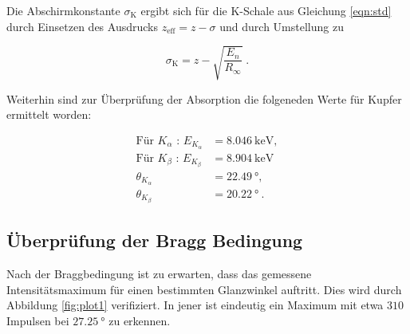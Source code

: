   Die Abschirmkonstante $\sigma_\text{K}$ ergibt sich für die K-Schale aus Gleichung
  \eqref{eqn:std} durch Einsetzen des Ausdrucks $z_\text{eff} = z -\sigma$ und durch 
  Umstellung zu 

  \begin{equation}
    \sigma_\text{K} = z - \sqrt{\frac{E_n}{R_{\infty}}} \; .
    \label{eqn:sigma}
  \end{equation}

  Weiterhin sind zur Überprüfung der Absorption die folgeneden Werte für Kupfer 
  ermittelt worden:

  \begin{align*}
    \text{Für } K_\alpha \text{ : } E_{K_\alpha} &= \SI{8.046}{\kilo\eV}, \\
    \text{Für } K_\beta \text{ : } E_{K_\beta} &= \SI{8.904}{\kilo\eV} \\
    \theta_{K_\alpha} &= \SI{22.49}{\degree}, \\
    \theta_{K_\beta} &= \SI{20.22}{\degree} \: .
 \end{align*}









\subsection{Überprüfung der Bragg Bedingung}

Nach der Braggbedingung ist zu erwarten, dass das gemessene Intensitätsmaximum
für einen bestimmten Glanzwinkel auftritt. 
Dies wird durch Abbildung \ref{fig:plot1} verifiziert. In jener ist eindeutig ein Maximum 
mit etwa $310$ Impulsen bei $\SI{27.25}{\degree}$ zu erkennen.

